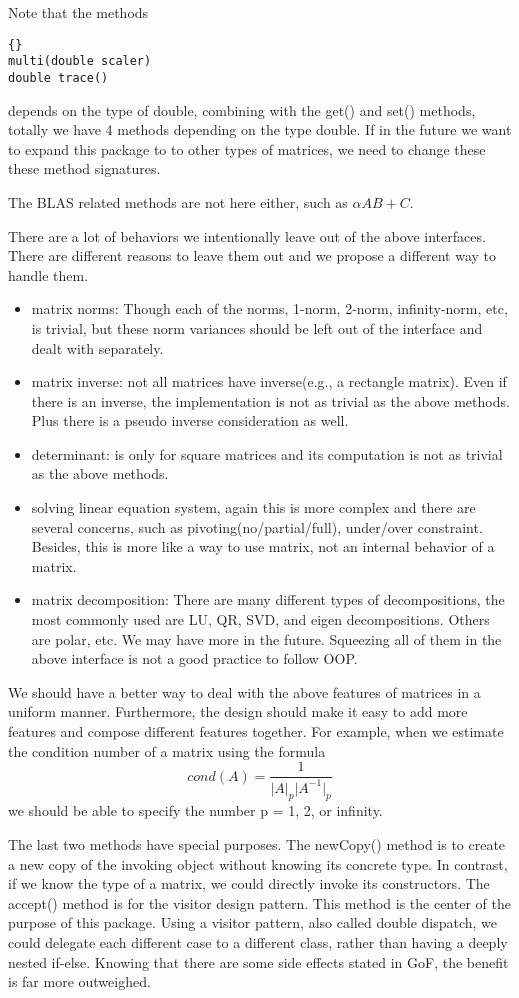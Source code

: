 Note that the methods 
\lstset{language=Java}
\lstset{commentstyle=\textit}
\begin{lstlisting}[frame=trbl]{}
multi(double scaler)
double trace()
\end{lstlisting}
depends on the type of double, combining with the get() and set() methods, totally we have 4 methods depending on the type double. If in the future we want to expand this package to to other types of matrices, we need to change these these method signatures.

The BLAS related methods are not here either, such as $\alpha AB + C$.

There are a lot of behaviors we intentionally leave out of the above interfaces. There are different reasons to leave them out and we propose a different way to handle them.
\begin{itemize}
\item matrix norms: Though each of the norms, 1-norm, 2-norm, infinity-norm, etc, is trivial, but these norm variances should be left out of the interface and dealt with separately.
\item matrix inverse: not all matrices have inverse(e.g., a rectangle matrix). Even if there is an inverse, the implementation is not as trivial as the above methods. Plus there is a pseudo inverse consideration as well.
\item determinant: is only for square matrices and its computation is not as trivial as the above methods. 
\item solving linear equation system, again this is more complex and there are several concerns, such as pivoting(no/partial/full), under/over constraint. Besides, this is more like a way to use matrix, not an internal behavior of a matrix.
\item matrix decomposition: There are many different types of decompositions, the most commonly used are LU, QR, SVD, and eigen decompositions. Others are polar, etc. We may have more in the future. Squeezing all of them in the above interface is not a good practice to follow OOP. 
\end{itemize}
We should have a better way to deal with the above features of matrices in a uniform manner. Furthermore, the design should make it easy to add more features and compose different features together. For example, when we estimate the condition number of a matrix using the formula
\[cond(A) = \frac{1}{\bigl|A\bigr|_p \bigl|A^{-1}\bigr|_p} \]
we should be able to specify the number p = 1, 2, or infinity. 

The last two methods have special purposes. The newCopy() method is to create a new copy of the invoking object without knowing its concrete type. In contrast, if we know the type of a matrix, we could directly invoke its constructors. The accept() method is for the visitor design pattern. This method is the center of the purpose of this package. Using a visitor pattern, also called double dispatch, we could delegate each different case to a different class, rather than having a deeply nested if-else. Knowing that there are some side effects stated in GoF, the benefit is far more outweighed.


